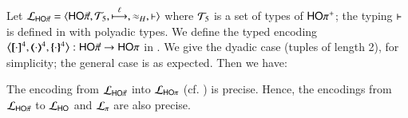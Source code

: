Let $\tyl{L}_{\PHOp}=\calc{\PHOp}{{\cal{T}}_5}{\hby{\ell}}{\wb_H}{\proves}$
where 
${\cal{T}}_5$ is a set of types of $\mathsf{HO\pi^{+}}$;  
the typing $\vdash$ is defined in 
 with polyadic types. 
We define %
the typed encoding $\enco{\map{\cdot}^{4}, \mapt{\cdot}^{4}, \mapa{\cdot}^{4}}: \PHOp \to \HOp$ 
in . We give the dyadic case (tuples of length 2), for simplicity;
the general case is as expected.
Then we have:

\smallskip 

\begin{theorem}
\label{f:enc:phopiptohopi}
The encoding from $\mathcal{L}_{\mathsf{HO}{\vec{\pi}}}$ into $\mathcal{L}_{\mathsf{HO}\pi}$ (cf. )
is precise. 
Hence, the encodings 
from $\mathcal{L}_{\mathsf{HO}{\vec{\pi}}}$ to 
$\mathcal{L}_{\mathsf{HO}}$ 
and $\mathcal{L}_{\pi}$ 
are also precise. 
\end{theorem}

